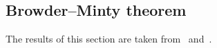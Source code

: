 \documentclass[a4paper,10pt,oneside]{amsbook}
\numberwithin{section}{chapter}
\numberwithin{equation}{chapter}
\theoremstyle{definition}
\newtheorem{thm}[prop]{Theorem}
\DeclarePairedDelimiter{\norm}{\lVert}{\rVert}
\begin{document}
%

\subsection{Browder--Minty theorem}
\label{subsec:minty-browder}

The results of this section are taken from~\cite{intro-pde} and~\cite{roubicek-pde}.
\end{document}
